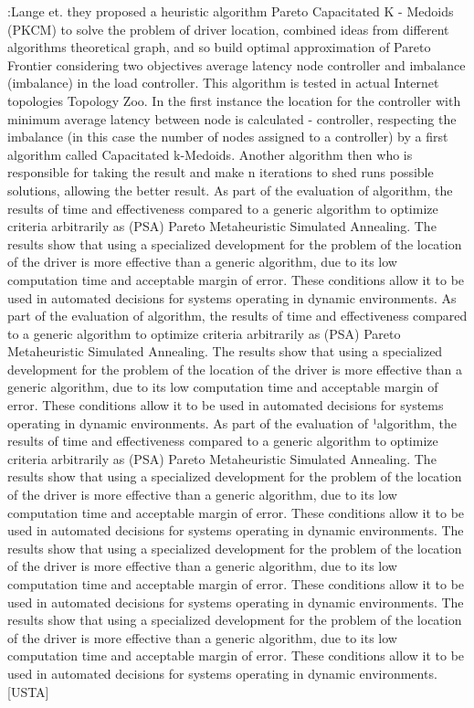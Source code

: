 \documentclass[a4paper,10pt]{article}
\begin{document}
\cite{LaGe15}:Lange et. they proposed a heuristic algorithm Pareto Capacitated K - Medoids (PKCM) to solve the problem of driver location, combined ideas from different algorithms theoretical graph, and so build optimal approximation of Pareto Frontier considering two objectives average latency node controller and imbalance (imbalance) in the load controller. This algorithm is tested in actual Internet topologies Topology Zoo. In the first instance the location for the controller with minimum average latency between node is calculated - controller, respecting the imbalance (in this case the number of nodes assigned to a controller) by a first algorithm called Capacitated k-Medoids. 
Another algorithm then who is responsible for taking the result and make n iterations to shed runs possible solutions, allowing the better result. As part of the evaluation of algorithm, the results of time and effectiveness compared to a generic algorithm to optimize criteria arbitrarily as (PSA) Pareto Metaheuristic Simulated Annealing. The results show that using a specialized development for the problem of the location of the driver is more effective than a generic algorithm, due to its low computation time and acceptable margin of error. 
These conditions allow it to be used in automated decisions for systems operating in dynamic environments. As part of the evaluation of algorithm, the results of time and effectiveness compared to a generic algorithm to optimize criteria arbitrarily as (PSA) Pareto Metaheuristic Simulated Annealing. The results show that using a specialized development for the problem of the location of the driver is more effective than a generic algorithm, due to its low computation time and acceptable margin of error. These conditions allow it to be used in automated decisions for systems operating in dynamic environments. 
As part of the evaluation of ¹algorithm, the results of time and effectiveness compared to a generic algorithm to optimize criteria arbitrarily as (PSA) Pareto Metaheuristic Simulated Annealing. The results show that using a specialized development for the problem of the location of the driver is more effective than a generic algorithm, due to its low computation time and acceptable margin of error. These conditions allow it to be used in automated decisions for systems operating in dynamic environments. The results show that using a specialized development for the problem of the location of the driver is more effective than a generic algorithm, due to its low computation time and acceptable margin of error. 
These conditions allow it to be used in automated decisions for systems operating in dynamic environments. The results show that using a specialized development for the problem of the location of the driver is more effective than a generic algorithm, due to its low computation time and acceptable margin of error. These conditions allow it to be used in automated decisions for systems operating in dynamic environments. [USTA]
\end{document}
